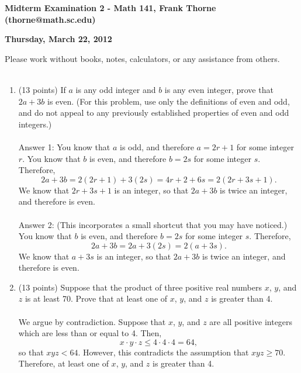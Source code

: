 \documentclass[12pt]{article}
\begin{document}
\setlength{\topmargin}{-12mm}






\begin{center}{\bf Midterm Examination 2 - Math 141, Frank Thorne (thorne@math.sc.edu)}
\end{center}
\begin{center}
{\bf Thursday, March 22, 2012}
\end{center}

Please work without books, notes, calculators, or any assistance from others.
\\
\\
\begin{enumerate}[1.]
\item (13 points)
If $a$ is any odd integer and $b$ is any even integer, prove that $2a + 3b$ is even.
(For this problem, use only the definitions of even and odd, and do not appeal to any previously
established properties of even and odd integers.)
\\
\\
Answer 1:
You know that $a$ is odd, and therefore $a = 2r + 1$ for some integer $r$. You know that $b$ is even,
and therefore $b = 2s$ for some integer $s$. Therefore,
$$2a + 3b = 2(2r + 1) + 3(2s) = 4r + 2 + 6s = 2(2r + 3s + 1).$$
We know that $2r + 3s + 1$ is an integer, so that $2a + 3b$ is twice an integer, and therefore is even.
\\
\\
Answer 2: (This incorporates a small shortcut that you may have noticed.)
You know that $b$ is even, and therefore $b = 2s$ for some integer $s$. Therefore,
$$2a + 3b = 2a + 3(2s) = 2(a + 3s).$$
We know that $a + 3s$ is an integer, so that $2a + 3b$ is twice an integer, and therefore is even.

\item (13 points)
Suppose that the product of three positive real numbers $x$, $y$, and $z$ is at least 70.
Prove that at least one of $x$, $y$, and $z$ is greater than 4.
\\
\\
We argue by contradiction. Suppose that $x$, $y$, and $z$ are all positive integers which are less than or equal
to 4. Then,
$$x \cdot y \cdot z \leq 4 \cdot 4 \cdot 4 = 64,$$
so that $xyz < 64$. However, this contradicts the assumption that $xyz \geq 70$. Therefore, at least one of $x$, $y$, and $z$
is greater than 4.


\end{enumerate}
\end{document}
